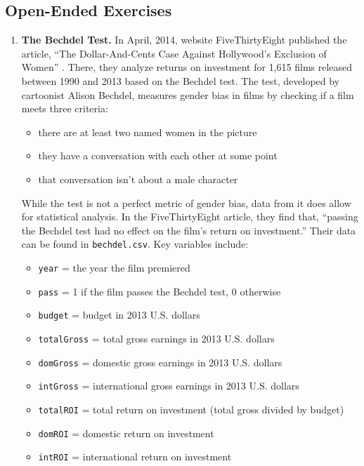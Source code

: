 \documentclass[
]{krantz}
\providecommand{\tightlist}{%
  \setlength{\itemsep}{0pt}\setlength{\parskip}{0pt}}
\begin{document}
\hypertarget{open-ended-exercises}{%
\subsection{Open-Ended Exercises}\label{open-ended-exercises}}

\begin{enumerate}
\def\labelenumi{\arabic{enumi}.}
\item
  \textbf{The Bechdel Test.} In April, 2014, website FiveThirtyEight published the article, ``The Dollar-And-Cents Case Against Hollywood's Exclusion of Women'' \citep{Hickey2014}. There, they analyze returns on investment for 1,615 films released between 1990 and 2013 based on the Bechdel test. The test, developed by cartoonist Alison Bechdel, measures gender bias in films by checking if a film meets three criteria:

  \begin{itemize}
  \tightlist
  \item
    there are at least two named women in the picture
  \item
    they have a conversation with each other at some point
  \item
    that conversation isn't about a male character
  \end{itemize}

  While the test is not a perfect metric of gender bias, data from it does allow for statistical analysis. In the FiveThirtyEight article, they find that, ``passing the Bechdel test had no effect on the film's return on investment.'' Their data can be found in \texttt{bechdel.csv}. Key variables include:

  \begin{itemize}
  \tightlist
  \item
    \texttt{year} = the year the film premiered
  \item
    \texttt{pass} = 1 if the film passes the Bechdel test, 0 otherwise
  \item
    \texttt{budget} = budget in 2013 U.S. dollars
  \item
    \texttt{totalGross} = total gross earnings in 2013 U.S. dollars
  \item
    \texttt{domGross} = domestic gross earnings in 2013 U.S. dollars
  \item
    \texttt{intGross} = international gross earnings in 2013 U.S. dollars
  \item
    \texttt{totalROI} = total return on investment (total gross divided by budget)
  \item
    \texttt{domROI} = domestic return on investment
  \item
    \texttt{intROI} = international return on investment
  \end{itemize}


\end{enumerate}
\end{document}
